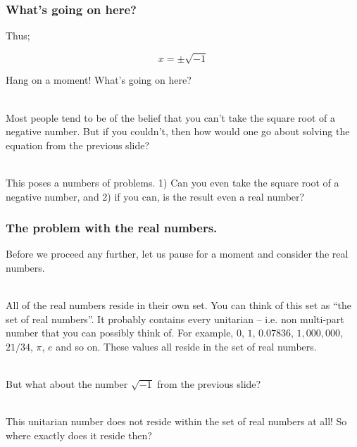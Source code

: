 \begin{frame}
\frametitle{What's going on here?}

Thus;

\begin{equation}
  x = \pm\sqrt{-1}
\end{equation}

Hang on a moment! What's going on here?\\~\

Most people tend to be of the belief that you can't take the square root of a negative number. But if you couldn't, then how would one go about solving
the equation from the previous slide?\\~\

This poses a numbers of problems. 1) Can you even take the square root of a negative number, and 2) if you can, is the result even a real number?


\end{frame}


%
%

\begin{frame}
\frametitle{The problem with the real numbers.}

Before we proceed any further, let us pause for a moment and consider the real numbers.\\~\

All of the real numbers reside in their own set. You can think of this set as ``the set of real numbers''. It probably contains every unitarian -- i.e. 
non multi-part number that you can possibly think of. For example, \(0\), \(1\), \(0.07836\), \(1,000,000\), \(21/34\),
\(\pi\), \(e\) and so on. These values all reside in the set of real numbers.\\~\

But what about the number \(\sqrt{-1}\) from the previous slide?\\~\

This unitarian number does not reside within the set of real numbers at all! So where exactly does it reside then?\\~\

\end{frame}


%
%

